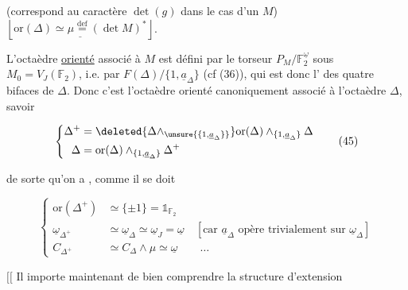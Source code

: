 (correspond au caractère $\det(g)$ dans le cas d'un $M$)  $\left\lfloor\underline{\mathrm{or}(\Delta)\simeq\mu\overset{\mathrm{def}}{=}(\det M)^*}\right\rfloor$.

L'octaèdre \uline{orienté} \inserted{$\Delta^+$} associé à $M$ est défini par le torseur $P_M/\mathbb F_2^{\underline\omega}$ sous $M_0=V_J(\mathbb F_2)$, i.e. par
$F(\Delta)/\{1,\underline a_\Delta\}$ (cf (36)), qui est donc l' des quatre bifaces de $\Delta$. Donc c'est l'octaèdre orienté canoniquement associé à l'octaèdre $\Delta$, savoir

\[
\left\{\begin{aligned}
\Delta^+ &= \deleted{\Delta\wedge_{\unsure{\{1,\underline a_\Delta\}}}}
 \mathrm{or}(\Delta)\wedge_{\{1,\underline a_\Delta\}}\Delta\\
\Delta &= \mathrm{or}(\Delta)\wedge_{\{1,\underline a_\Delta\}}\Delta^+
\end{aligned}\right. \tag*{(45)}
\]

de sorte qu'on a , comme il se doit

\[
\left\{\begin{aligned}
\mathrm{or}(\Delta^+) &\simeq \{\pm1\}=\mathbb 1_{\mathbb F_2}\\
\underline\omega_{\Delta^+} &\simeq \underline\omega_\Delta\simeq\underline\omega_J=\underline\omega
\quad [\text{car }\underline a_\Delta\text{ opère trivialement sur }\underline\omega_\Delta]\\
C_{\Delta^+} &\simeq C_\Delta\wedge\mu \simeq \underline\omega\qquad \ldots
\end{aligned}\right. \tag*{(45)}
\]

$[\![$ Il importe maintenant de bien comprendre la structure d'extension


